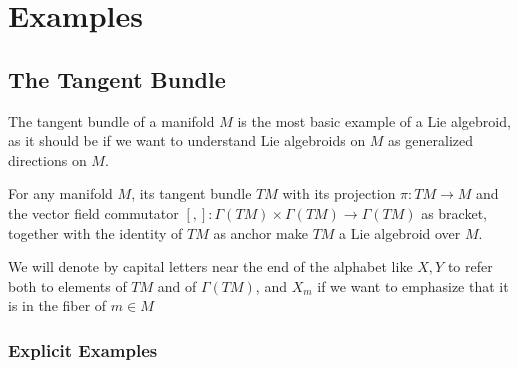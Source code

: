 \begin{definition}

\end{definition}

\begin{definition}

\end{definition}

\begin{definition}[Pullbacks]

\end{definition}

\begin{definition}[Quotients]

\end{definition}

\section{Examples}
\subsection{The Tangent Bundle}

The tangent bundle of a manifold $M$ is the most basic example of a Lie algebroid, as it should be if we want to understand Lie algebroids on $M$ as generalized directions on $M$.

For any manifold $M$, its tangent bundle $TM$ with its projection $\pi:TM \to M$ and the vector field commutator $[,]: \Gamma(TM)\times \Gamma(TM) \to \Gamma(TM)$ as bracket, together with the identity of $TM$ as anchor make $TM$ a Lie algebroid over $M$.

We will denote by capital letters near the end of the alphabet like $X, Y$ to refer both to elements of $TM$ and of $\Gamma(TM)$, and $X_m$ if we want to emphasize that it is in the fiber of $m \in M$

\subsubsection{Explicit Examples}

